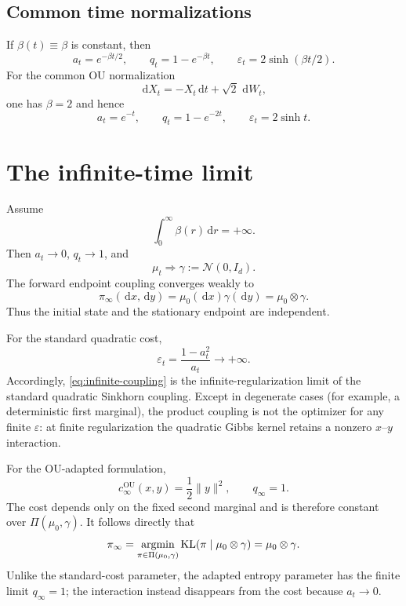 \documentclass[11pt]{article}
\theoremstyle{remark}
\newcommand{\N}{\mathcal{N}}
\newcommand{\KL}{\operatorname{KL}}
\newcommand{\PiC}{\Pi}
\newcommand{\dd}{\,\mathrm{d}}
\begin{document}
\subsection{Common time normalizations}

If $\beta(t)\equiv\beta$ is constant, then
\[
  a_t=e^{-\beta t/2},
  \qquad q_t=1-e^{-\beta t},
  \qquad \varepsilon_t=2\sinh(\beta t/2).
\]
For the common OU normalization
\begin{equation}
  \dd X_t=-X_t\dd t+\sqrt2\,\dd W_t,
\end{equation}
one has $\beta=2$ and hence
\begin{equation}
  a_t=e^{-t},
  \qquad q_t=1-e^{-2t},
  \qquad \boxed{\varepsilon_t=2\sinh t}.
\end{equation}

\section{The infinite-time limit}

Assume
\begin{equation}
  \label{eq:infinite-noise}
  \int_0^\infty\beta(r)\dd r=+\infty.
\end{equation}
Then $a_t\to0$, $q_t\to1$, and
\begin{equation}
  \mu_t\Longrightarrow\gamma:=\N(0,I_d).
\end{equation}
The forward endpoint coupling converges weakly to
\begin{equation}
  \label{eq:infinite-coupling}
  \boxed{\quad
  \pi_\infty(\dd x,\dd y)
  =\mu_0(\dd x)\gamma(\dd y)
  =\mu_0\otimes\gamma.
  \quad}
\end{equation}
Thus the initial state and the stationary endpoint are independent.

For the standard quadratic cost,
\begin{equation}
  \varepsilon_t=\frac{1-a_t^2}{a_t}\longrightarrow+\infty.
\end{equation}
Accordingly, \eqref{eq:infinite-coupling} is the infinite-regularization limit
of the standard quadratic Sinkhorn coupling.  Except in degenerate cases
(for example, a deterministic first marginal), the product coupling is not
the optimizer for any finite $\varepsilon$: at finite regularization the
quadratic Gibbs kernel retains a nonzero $x$--$y$ interaction.

For the OU-adapted formulation,
\[
  c_\infty^{\mathrm{OU}}(x,y)=\frac12\lVert y\rVert^2,
  \qquad q_\infty=1.
\]
The cost depends only on the fixed second marginal and is therefore constant
over $\PiC(\mu_0,\gamma)$.  It follows directly that
\begin{equation}
  \pi_\infty
  =\mathop{\rm argmin}_{\pi\in\PiC(\mu_0,\gamma)}
    \KL(\pi\mid\mu_0\otimes\gamma)
  =\mu_0\otimes\gamma.
\end{equation}
Unlike the standard-cost parameter, the adapted entropy parameter has the
finite limit $q_\infty=1$; the interaction instead disappears from the cost
because $a_t\to0$.
\end{document}
